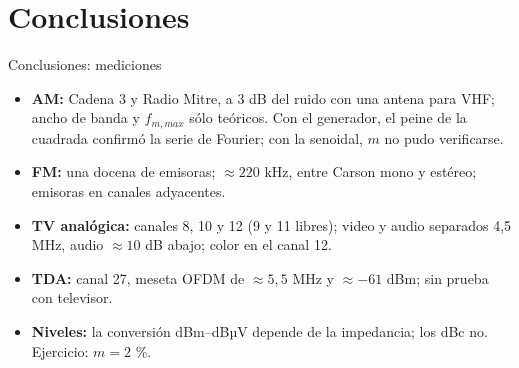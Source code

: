 \section[Conclusiones]{Conclusiones}
\begin{frame}{Conclusiones: mediciones}
  \small
  \begin{itemize}
    \item \textbf{AM:} Cadena 3 y Radio Mitre, a 3 dB del ruido con una antena para VHF; ancho de banda y $f_{m,max}$ sólo teóricos. Con el generador, el peine de la cuadrada confirmó la serie de Fourier; con la senoidal, $m$ no pudo verificarse.
    \item \textbf{FM:} una docena de emisoras; $\approx 220$ kHz, entre Carson mono y estéreo; emisoras en canales adyacentes.
    \item \textbf{TV analógica:} canales 8, 10 y 12 (9 y 11 libres); video y audio separados 4,5 MHz, audio $\approx 10$ dB abajo; color en el canal 12.
    \item \textbf{TDA:} canal 27, meseta OFDM de $\approx 5{,}5$ MHz y $\approx -61$ dBm; sin prueba con televisor.
    \item \textbf{Niveles:} la conversión dBm--dBµV depende de la impedancia; los dBc no. Ejercicio: $m = 2$ \%.
  \end{itemize}
\end{frame}

